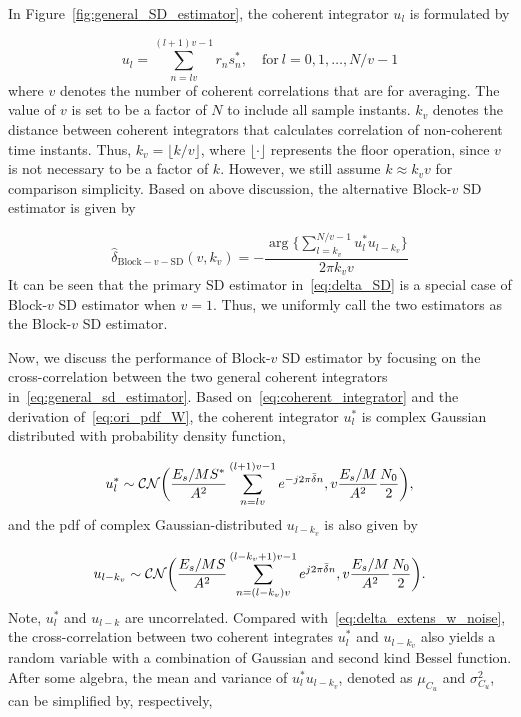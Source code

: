 In Figure~\ref{fig:general_SD_estimator}, the coherent integrator $u_l$ is formulated by

\begin{equation}
  \label{eq:coherent_integrator}
  u_l=\sum_{n=lv}^{(l+1)v-1}r_ns_n^*, \quad \text{for}~l=0,1,\ldots,N/v{-}1
\end{equation}
where $v$ denotes the number of coherent correlations that are for averaging. 
The value of $v$ is set to be a factor of $N$ to include all sample instants.
$k_v$ denotes the distance between coherent integrators 
that calculates correlation of non-coherent time instants.
Thus, $k_v=\lfloor k/v \rfloor$, where $\lfloor \cdot \rfloor$ represents the floor operation, since $v$ is not necessary to be a factor of $k$.
However, we still assume $k\approx k_vv$ for comparison simplicity. Based on above discussion, the alternative Block-$v$ SD estimator is given by

\begin{equation}
  \label{eq:general_sd_estimator}
  \hat{\delta}_{\text{Block}-v-\text{SD}}(v,k_v)=-\frac{\arg\big\{\sum_{l=k_v}^{N/v-1}u_l^*u_{l-k_v}\big\}}{2\pi k_vv}
\end{equation}
It can be seen that the primary SD estimator in~\eqref{eq:delta_SD} is a special case of Block-$v$ SD estimator when $v=1$.
Thus, we uniformly call the two estimators as the Block-$v$ SD estimator.

Now, we discuss the performance of Block-$v$ SD estimator by focusing on the cross-correlation between the two general coherent integrators in~\eqref{eq:general_sd_estimator}.
Based on~\eqref{eq:coherent_integrator} and the derivation of~\eqref{eq:ori_pdf_W}, the coherent integrator $u_l^*$ is complex Gaussian distributed with probability density function,

\begin{equation*}
  \label{eq:pdf_co_integrator_1}
  u_l^* \sim \mathcal{CN}\bigg(\frac{E_s/MS^*}{A^2}\sum_{n=lv}^{(l+1)v-1}e^{-j2\pi \bar{\delta}n},v\frac{E_s/M}{A^2}\frac{N_0}{2}\bigg),
\end{equation*}
and the pdf of complex Gaussian-distributed $u_{l-k_v}$ is also given by

\begin{equation*}
  \label{eq:pdf_co_integrator_2}
  u_{l-k_v} \sim \mathcal{CN}\bigg(\frac{E_s/MS}{A^2}\sum_{n=(l-k_v)v}^{(l-k_v+1)v-1}e^{j2\pi \bar{\delta}n},v\frac{E_s/M}{A^2}\frac{N_0}{2}\bigg).
\end{equation*}
Note, $u_l^*$ and $u_{l-k}$ are uncorrelated. Compared with~\eqref{eq:delta_extens_w_noise}, the cross-correlation between two coherent integrates $u_l^*$ and $u_{l-k_v}$ also yields a random variable
with a combination of Gaussian and second kind Bessel function. After some algebra, the mean and variance of $u_l^*u_{l-k_v}$, denoted as $\mu_{C_u}$ and $\sigma^2_{C_u}$, can be simplified by, respectively,

